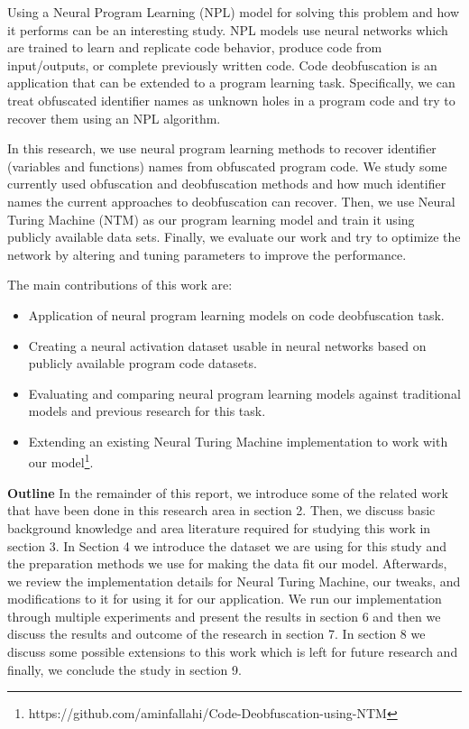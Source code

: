 \documentclass[acmsmall]{acmart}
\begin{document}
Using a Neural Program Learning (NPL) model for solving this problem and how it performs can be an interesting study. NPL models use neural networks which are trained to learn and replicate code behavior, produce code from input/outputs, or complete previously written code. Code deobfuscation is an application that can be extended to a program learning task. Specifically, we can treat obfuscated identifier names as unknown holes in a program code and try to recover them using an NPL algorithm.

In this research, we use neural program learning methods to recover identifier (variables and functions) names from obfuscated program code. We study some currently used obfuscation and deobfuscation methods and how much identifier names the current approaches to deobfuscation can recover. Then, we use Neural Turing Machine (NTM) \cite{ntm} as our program learning model and train it using publicly available data sets. Finally, we evaluate our work and try to optimize the network by altering and tuning parameters to improve the performance.

The main contributions of this work are:
\begin{itemize}
	\item Application of neural program learning models on code deobfuscation task.
	\item Creating a neural activation dataset usable in neural networks based on publicly available program code datasets.
	\item Evaluating and comparing neural program learning models against traditional models and previous research for this task.
	\item Extending an existing Neural Turing Machine implementation to work with our model\footnote[1]{https://github.com/aminfallahi/Code-Deobfuscation-using-NTM}.
\end{itemize}

\textbf{Outline} In the remainder of this report, we introduce some of the related work that have been done in this research area in section 2. Then, we discuss basic background knowledge and area literature required for studying this work in section 3. In Section 4 we introduce the dataset we are using for this study and the preparation methods we use for making the data fit our model. Afterwards, we review the implementation details for Neural Turing Machine, our tweaks, and modifications to it for using it for our application. We run our implementation through multiple experiments and present the results in section 6 and then we discuss the results and outcome of the research in section 7. In section 8 we discuss some possible extensions to this work which is left for future research and finally, we conclude the study in section 9.
\end{document}

